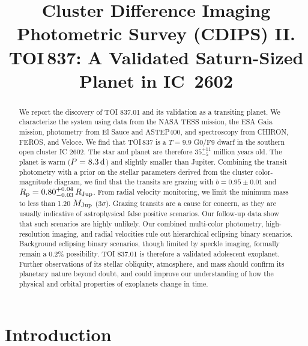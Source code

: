 \documentclass[12pt,twocolumn,tighten]{aastex63}
\begin{document}

\title{
  Cluster Difference Imaging Photometric Survey (CDIPS) II.
  TOI$\,$837: A Validated Saturn-Sized Planet in IC~2602
}

\suppressAffiliations


\begin{abstract}
  We report the discovery of TOI 837.01 and its validation as a
  transiting planet.  We characterize the system using data from the
  NASA TESS mission, the ESA Gaia mission, photometry from El Sauce
  and ASTEP400, and spectroscopy from CHIRON, FEROS, and Veloce.  We
  find that TOI$\,$837 is a $T=9.9$ G0/F9 dwarf in the southern open
  cluster IC 2602.  The star and planet are therefore $35^{+11}_{-5}$
  million years old.  The planet is warm ($P = 8.3\,{\rm d}$) and
  slightly smaller than Jupiter.  Combining the transit photometry
  with a prior on the stellar parameters derived from the cluster
  color-magnitude diagram, we find that the transits are grazing with
  $b=0.95\pm0.01$ and $R_{\rm p} = 0.80^{+0.04}_{-0.03} \,R_{\rm
  Jup}$.  From radial velocity monitoring, we limit the minimum mass
  to less than 1.20 $M_{\rm Jup}$ (3$\sigma$).  Grazing transits are a
  cause for concern, as they are usually indicative of astrophysical
  false positive scenarios.  Our follow-up data show that such
  scenarios are highly unlikely.  Our combined multi-color photometry,
  high-resolution imaging, and radial velocities rule out hierarchical
  eclipsing binary scenarios.  Background eclipsing binary scenarios,
  though limited by speckle imaging, formally remain a 0.2\%
  possibility.  TOI 837.01 is therefore a validated adolescent
  exoplanet.  Further observations of its stellar obliquity,
  atmosphere, and mass should confirm its planetary nature beyond
  doubt, and could improve our understanding of how the physical and
  orbital properties of exoplanets change in time.
\end{abstract}




\section{Introduction}
\end{document}
